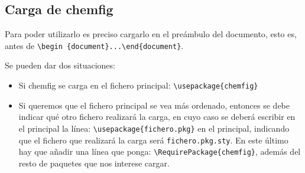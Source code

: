 \subsection{Carga de \textsf{chemfig}}
Para poder utilizarlo es preciso cargarlo en el preámbulo del documento, esto es,
antes de \texttt{\textbackslash begin
  \{document\}...\textbackslash end\{document\}}.

Se pueden dar dos situaciones:
\vspace{-1ex}
\begin{itemize}
\item Si \textsf{chemfig} se carga en el fichero principal:
  \textcolor{\standoutColor}{\texttt{\textbackslash usepackage\{chemfig\}}}
\item Si queremos que el fichero principal se vea más ordenado, entonces se debe
  indicar qué otro fichero realizará la carga, en cuyo caso se deberá escribir en
  el principal la línea: 
  \textcolor{\standoutColor}{\texttt{\textbackslash usepackage\{fichero.pkg\}}} en el
  principal, indicando que el fichero que realizará la carga será 
 \texttt{fichero.pkg.sty}. En este último hay que añadir una línea que ponga:
 \textcolor{\standoutColor}{\texttt{\textbackslash RequirePackage\{chemfig\}}},
 además del resto de paquetes que nos interese cargar.
\end{itemize}

